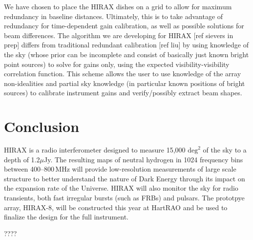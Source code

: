 \documentclass[]{spie}  %
\begin{document}
We have chosen to place the HIRAX dishes on a grid to allow for maximum redundancy in baseline distances. Ultimately, this is to take advantage of redundancy for time-dependent gain calibration, as well as possible solutions for beam differences. The algorithm we are developing for HIRAX [ref sievers in prep] differs from traditional redundant calibration [ref liu] by using knowledge of the sky (whose prior can be incomplete and consist of basically just known bright point sources) to solve for gains only, using the expected visibility-visibility correlation function. This scheme allows the user to use knowledge of the array non-idealities and partial sky knowledge (in particular known positions of bright sources) to calibrate instrument gains and verify/possibly extract beam shapes. \newline

\section{Conclusion}

HIRAX is a radio interferometer designed to measure 15,000 $\mathrm{deg}^{2}$ of the sky to a depth of 1.2$\mu$Jy. The resulting maps of neutral hydrogen in 1024 frequency bins between 400--800\,MHz will provide low-resolution measurements of large scale structure to better understand the nature of Dark Energy through its impact on the expansion rate of the Universe. HIRAX will also monitor the sky for radio transients, both fast irregular bursts (such as FRBs) and pulsars. The prototpye array, HIRAX-8, will be constructed this year at HartRAO and be used to finalize the design for the full instrument.

\label{sec:conc}



   

\acknowledgments %
 
????

\end{document}
